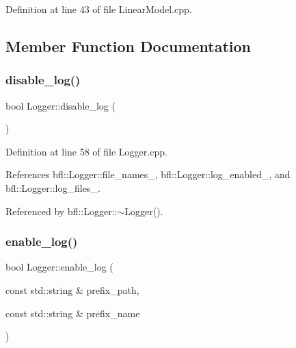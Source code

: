Definition at line 43 of file Linear\+Model.\+cpp.



\subsection{Member Function Documentation}
\mbox{\label{classbfl_1_1Logger_a440467a28ccc46490d767fe0ef6f556a}} 
\subsubsection{\texorpdfstring{disable\+\_\+log()}{disable\_log()}}
{\footnotesize\ttfamily bool Logger\+::disable\+\_\+log (\begin{DoxyParamCaption}{ }\end{DoxyParamCaption})\hspace{0.3cm}{\ttfamily [inherited]}}



Definition at line 58 of file Logger.\+cpp.



References bfl\+::\+Logger\+::file\+\_\+names\+\_\+, bfl\+::\+Logger\+::log\+\_\+enabled\+\_\+, and bfl\+::\+Logger\+::log\+\_\+files\+\_\+.



Referenced by bfl\+::\+Logger\+::$\sim$\+Logger().

\mbox{\label{classbfl_1_1Logger_ae94b97b6e8d7902e8ce048384813122e}} 
\subsubsection{\texorpdfstring{enable\+\_\+log()}{enable\_log()}}
{\footnotesize\ttfamily bool Logger\+::enable\+\_\+log (\begin{DoxyParamCaption}\item[{const std\+::string \&}]{prefix\+\_\+path,  }\item[{const std\+::string \&}]{prefix\+\_\+name }\end{DoxyParamCaption})\hspace{0.3cm}{\ttfamily [inherited]}}




